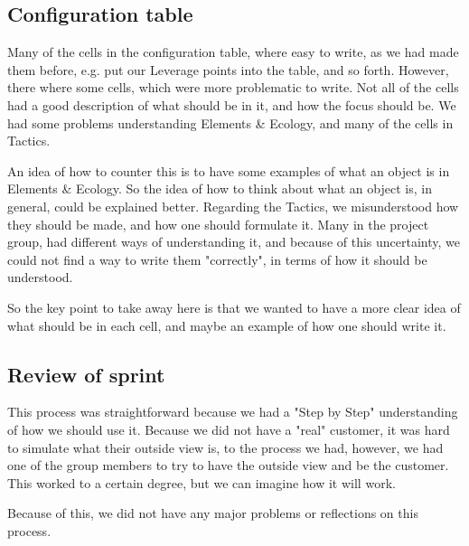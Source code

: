 \subsection{Configuration table}
Many of the cells in the configuration table, where easy to write, as we had made them before, e.g. put our Leverage points into the table, and so forth.
However, there where some cells, which were more problematic to write.
Not all of the cells had a good description of what should be in it, and how the focus should be.
We had some problems understanding Elements \& Ecology, and many of the cells in Tactics.

An idea of how to counter this is to have some examples of what an object is in Elements \& Ecology.
So the idea of how to think about what an object is, in general, could be explained better. 
Regarding the Tactics, we misunderstood how they should be made, and how one should formulate it.
Many in the project group, had different ways of understanding it, and because of this uncertainty, we could not find a way to write them "correctly", in terms of how it should be understood.

So the key point to take away here is that we wanted to have a more clear idea of what should be in each cell, and maybe an example of how one should write it.

\subsection{Review of sprint}
This process was straightforward because we had a "Step by Step" understanding of how we should use it.
Because we did not have a "real" customer, it was hard to simulate what their outside view is, to the process we had, however, we had one of the group members to try to have the outside view and be the customer.
This worked to a certain degree, but we can imagine how it will work.

Because of this, we did not have any major problems or reflections on this process.
